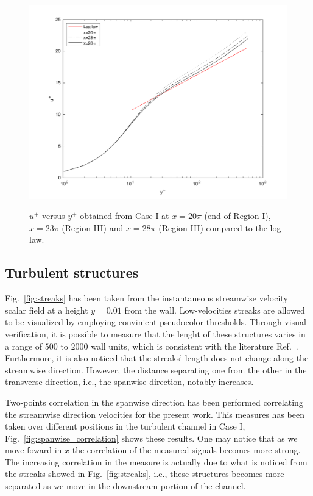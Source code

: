\documentclass[twocolumn,10pt]{asme2e}
\begin{document}
\begin{figure}[t]
\centering
\scalebox{0.5}
{\includegraphics{log_law_CI_downstream.pdf}}
\caption{\(u^+\) versus \(y^+\) obtained from Case I at \(x=20{\pi}\) (end of Region I), \(x=23{\pi}\) (Region III) and \(x=28{\pi}\) (Region III) compared to the log law.}
\label{fig:log_law_CI_downstream}
\end{figure}

\subsection*{Turbulent structures}

Fig.~\ref{fig:streaks} has been taken from the instantaneous streamwise velocity scalar field at a height \(y=0.01\) from the wall. Low-velocities streaks are allowed to be visualized by employing convinient pseudocolor thresholds. Through visual verification, it is possible to measure that the lenght of these structures varies in a range of \(500\) to \(2000\) wall units, which is consistent with the literature Ref.~\cite{carlier2005}. Furthermore, it is also noticed that the streaks' length does not change along the streamwise direction. However, the distance separating one from the other in the transverse direction, i.e., the spanwise direction, notably increases.

Two-points correlation in the spanwise direction has been performed correlating the streamwise direction velocities for the present work. This measures has been taken over different positions in the turbulent channel in Case I, Fig.~\ref{fig:spanwise_correlation} shows these results. One may notice that as we move foward in \(x\) the correlation of the measured signals becomes more strong. The increasing correlation in the measure is actually due to what is noticed from the streaks showed in Fig.~\ref{fig:streaks}, i.e., these structures becomes more separated as we move in the downstream portion of the channel.
\end{document}
